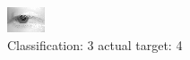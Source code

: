 \begin{figure}[h!]
\begin{center}
\includegraphics[width=0.60\columnwidth]{figures/ID2699_class_3_target_4.png}
\end{center}
\caption{ Classification: 3 actual target: 4}
\label{fig:ID2699_class_3_target_4}
\end{figure}

